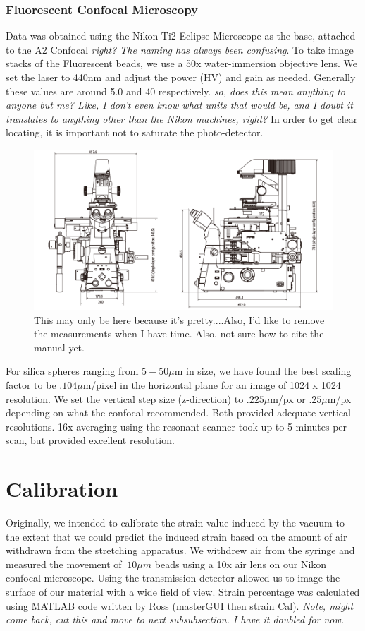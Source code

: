 \subsubsection{Fluorescent Confocal Microscopy}
Data was obtained using the Nikon Ti2 Eclipse Microscope as the base, attached to the A2 Confocal \emph{right? The naming has always been confusing}. To take image stacks of the Fluorescent beads, we use a 50x water-immersion objective lens. We set the laser to 440nm and adjust the power (HV) and gain as needed. Generally these values are around 5.0 and 40 respectively. \emph{so, does this mean anything to anyone but me? Like, I don't even know what units that would be, and I doubt it translates to anything other than the Nikon machines, right?} In order to get clear locating, it is important not to saturate the photo-detector. 

\begin{figure}
	\centering
	\includegraphics[width=0.7\linewidth]{confocal_stuff/Ti2_diagram_1}
		\caption[Nikon Ti2 Microscope Base]{This may only be here because it's pretty....Also, I'd like to remove the measurements when I have time. Also, not sure how to cite the manual yet.}
	\label{fig:ti2diagram1}
\end{figure}

For silica spheres ranging from $5-50 \mu$m in size, we have found the best scaling factor to be $.104 \mu$m/pixel in the horizontal plane for an image of 1024 x 1024 resolution. We set the vertical step size (z-direction) to $.225 \mu$m/px or $.25 \mu$m/px depending on what the confocal recommended. Both provided adequate vertical resolutions. 16x averaging using the resonant scanner took up to 5 minutes per scan, but provided excellent resolution. 


\section{Calibration}
Originally, we intended to calibrate the strain value induced by the vacuum to the extent that we could predict the induced strain based on the amount of air withdrawn from the stretching apparatus. We withdrew air from the syringe and measured the movement of $~10\mu m$ beads using a 10x air lens on our Nikon confocal microscope. Using the transmission detector allowed us to image the surface of our material with a wide field of view. Strain percentage was calculated using MATLAB code written by Ross (masterGUI then strain Cal). \emph{Note, might come back, cut this and move to next subsubsection. I have it doubled for now.}

